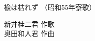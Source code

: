 \documentclass[10pt,b5j]{tarticle} %
\begin{document}
\begin{minipage}[c]{0.7\hsize} %
    \begin{center}
        {\LARGE
            楡は枯れず %
        }
        {\small 
            （昭和55年寮歌） %
        }
    \end{center}
\end{minipage}
\begin{minipage}[c]{0.3\hsize} %
    \begin{flushright} %
        新井桂二君 作歌\\奥田和人君 作曲 %
    \end{flushright}
\end{minipage}
\end{document}
